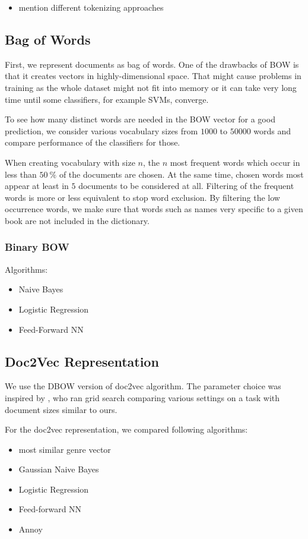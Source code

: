 \begin{itemize}
  \item mention different tokenizing approaches
\end{itemize}

\begin{comment}
  For each document size, we explore three document representations. Bag of words creates a vector based on the occurrence of words in vocabulary, doc2vec approach encodes the document in a vector in several hundred dimensional space. Finally, we use GloVe word-embeddings as an input to the Convolutional Neural Network.
\end{comment}

\subsection{Bag of Words}
First, we represent documents as bag of words. One of the drawbacks of BOW is that it creates vectors in highly-dimensional space. That might cause problems in training as the whole dataset might not fit into memory or it can take very long time until some classifiers, for example SVMs, converge.

To see how many distinct words are needed in the BOW vector for a good prediction, we consider various vocabulary sizes from $1000$ to $50000$ words and compare performance of the classifiers for those.

When creating vocabulary with size $n$, the $n$ most frequent words which occur in less than $50\ \%$ of the documents are chosen. At the same time, chosen words most appear at least in $5$ documents to be considered at all. Filtering of the frequent words is more or less equivalent to stop word exclusion. By filtering the low occurrence words, we make sure that words such as names very specific to a given book are not included in the dictionary.


\subsubsection{Binary BOW}
Algorithms:
\begin{itemize}
  \item Naive Bayes
  \item Logistic Regression
  \item Feed-Forward NN
\end{itemize}

\subsection{Doc2Vec Representation}
We use the DBOW version of doc2vec algorithm. The parameter choice was inspired by \cite{doc2vec_params}, who ran grid search comparing various settings on a task with document sizes similar to ours.

For the doc2vec representation, we compared following algorithms:
\begin{itemize}
  \item most similar genre vector
  \item Gaussian Naive Bayes
  \item Logistic Regression
  \item Feed-forward NN
  \item Annoy
\end{itemize}
